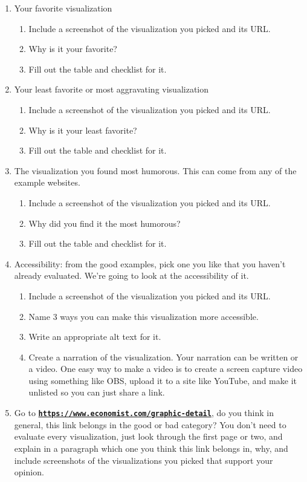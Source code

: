 \documentclass[12pt]{article}
\begin{document}
    \begin{enumerate}
        \item Your favorite visualization
        \begin{enumerate}
            \item Include a screenshot of the visualization you picked and its URL.
            \item Why is it your favorite?
            \item Fill out the table and checklist for it.
        \end{enumerate}
        \item Your least favorite or most aggravating visualization
        \begin{enumerate}
            \item Include a screenshot of the visualization you picked and its URL.
            \item Why is it your least favorite?
            \item Fill out the table and checklist for it.
        \end{enumerate}
        \item The visualization you found most humorous. This can come from any of the example websites.
        \begin{enumerate}
            \item Include a screenshot of the visualization you picked and its URL.
            \item Why did you find it the most humorous?
            \item Fill out the table and checklist for it.
        \end{enumerate}
        \item Accessibility: from the good examples, pick one you like that you haven't already evaluated. We're going to look at the accessibility of it.
        \begin{enumerate}
            \item Include a screenshot of the visualization you picked and its URL.
            \item Name 3 ways you can make this visualization more accessible.
            \item Write an appropriate alt text for it.
            \item Create a narration of the visualization. Your narration can be written or a video. One easy way to make a video is to create a screen capture video using something like OBS, upload it to a site like YouTube, and make it unlisted so you can just share a link.
        \end{enumerate}
        \item Go to \href{https://www.economist.com/graphic-detail}{\textbf{\nolinkurl{https://www.economist.com/graphic-detail}}}, do you think in general, this link belongs in the good or bad category? You don't need to evaluate every visualization, just look through the first page or two, and explain in a paragraph which one you think this link belongs in, why, and include screenshots of the visualizations you picked that support your opinion.
    \end{enumerate}
\end{document}
